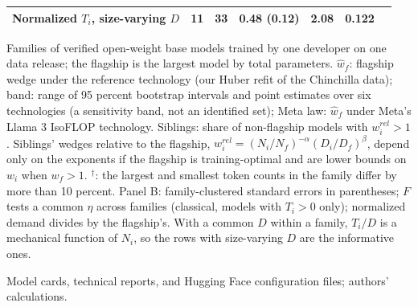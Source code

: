 \begin{table}[tp]
\begin{tabular}{@{}lcccccc@{}}
Normalized $T_i$, size-varying $D$ & 11 & 33 & 0.48 (0.12) & 2.08 & 0.122 & \\
\bottomrule
\end{tabular}
\par\smallskip
\begin{tablenotes}Families of verified open-weight base models trained by one developer on one data release; the
flagship is the largest model by total parameters. $\hat w_f$: flagship wedge under the reference technology (our
Huber refit of the Chinchilla data); band: range of 95 percent bootstrap intervals and point estimates over six
technologies (a sensitivity band, not an identified set); Meta law: $\hat w_f$ under Meta's Llama 3 IsoFLOP technology. Siblings: share of non-flagship models with $w^{rel}_i>1$. Siblings'
wedges relative to the flagship, $w^{rel}_i=(N_i/N_f)^{-\alpha}(D_i/D_f)^{\beta}$, depend only on the exponents if
the flagship is training-optimal and are lower bounds on $w_i$ when $w_f>1$. $^{\dagger}$: the largest and smallest token counts
in the family differ by more than 10 percent. Panel B: family-clustered standard errors in
parentheses; $F$ tests a common $\eta$ across families (classical, models with $T_i>0$ only); normalized demand divides
by the flagship's. With a common $D$ within a
family, $T_i/D$ is a mechanical function of $N_i$, so the rows with size-varying $D$ are the informative
ones.\end{tablenotes}
\begin{tablenotes}[Source]Model cards, technical reports, and Hugging Face configuration files; authors'
calculations.\end{tablenotes}
\end{table}

